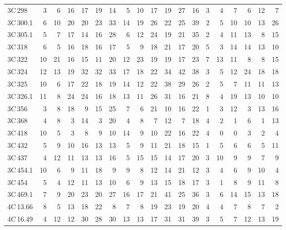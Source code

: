 \documentclass[mathleft,fleqn,%
]{an}
\begin{document}
\begin{table*}
\begin{tabular}{l|rrrrrr|rrrrrr|rrrrrr}
     3C\,298 &    3 &     6 &   16 &  17 &  19 &  14  &    5 &  10 &  17 &  19 &  27 &  16  &    3 &   4 &   7 &   6 &  12 &   7 \\
   3C\,300.1 &    6 &    10 &   20 &  20 &  23 &  33  &   14 &  19 &  26 &  22 &  25 &  39  &    2 &   5 &  10 &  10 &  13 &  26 \\
   3C\,305.1 &    5 &     7 &   17 &  14 &  16 &  28  &    6 &  12 &  24 &  19 &  21 &  35  &    2 &   4 &  11 &  13 &   8 &  15 \\
     3C\,318 &    6 &     5 &   16 &  18 &  16 &  17  &    5 &   9 &  18 &  21 &  17 &  20  &    5 &   3 &  14 &  14 &  13 &  10 \\
     3C\,322 &   10 &    21 &   16 &  15 &  11 &  20  &   12 &  23 &  19 &  19 &  17 &  23  &    7 &  13 &  11 &   8 &   8 &  15 \\
     3C\,324 &   12 &    13 &   19 &  32 &  32 &  33  &   17 &  18 &  22 &  34 &  42 &  38  &    3 &   5 &  12 &  24 &  18 &  18 \\
     3C\,325 &   10 &     6 &   17 &  22 &  18 &  19  &   14 &  12 &  22 &  38 &  29 &  26  &    2 &   5 &   7 &  11 &  11 &  13 \\
   3C\,326.1 &   11 &     8 &   24 &  24 &  16 &  18  &   13 &  11 &  26 &  31 &  16 &  21  &    8 &   4 &  19 &  13 &  10 &  10 \\
     3C\,356 &    3 &     8 &   18 &   9 &  15 &  25  &    7 &   6 &  21 &  10 &  16 &  22  &    1 &   3 &  12 &   3 &  13 &  16 \\
     3C\,368 &    4 &     8 &    3 &  14 &   3 &  20  &    4 &   8 &   7 &  12 &   7 &  18  &    4 &   2 &   1 &   6 &   1 &  13 \\
     3C\,418 &   10 &     5 &    3 &   8 &   9 &  10  &   14 &   9 &  10 &  22 &  16 &  22  &    4 &   0 &   0 &   3 &   2 &   4 \\
     3C\,432 &    5 &     9 &   10 &  16 &  13 &  13  &    5 &   9 &  11 &  21 &  18 &  15  &    1 &   5 &   6 &   6 &   5 &  11 \\
     3C\,437 &    4 &    12 &   11 &  13 &  13 &  16  &    5 &  15 &  15 &  14 &  17 &  20  &    3 &  10 &   9 &   9 &   7 &   9 \\
   3C\,454.1 &   10 &     6 &    9 &  11 &  18 &   9  &    9 &   8 &  12 &  14 &  21 &  12  &    3 &   4 &   6 &   9 &  10 &   4 \\
     3C\,454 &    5 &     4 &   12 &  11 &  13 &  10  &    6 &   9 &  13 &  15 &  18 &  17  &    3 &   1 &   8 &   9 &  11 &   8 \\
   3C\,469.1 &    7 &     9 &   20 &  23 &  20 &  27  &   16 &  17 &  21 &  41 &  25 &  36  &    3 &   6 &  14 &  15 &  13 &  18 \\
   4C\,13.66 &    8 &     5 &   13 &  18 &  22 &   8  &    7 &   8 &  19 &  23 &  19 &  20  &    4 &   4 &   7 &   8 &   7 &   2 \\
   4C\,16.49 &    4 &    12 &   12 &  30 &  28 &  30  &   13 &  13 &  17 &  31 &  31 &  39  &    3 &   5 &   7 &  12 &  13 &  19 \\
\hline
\end{tabular}
\end{table*}
\end{document}
